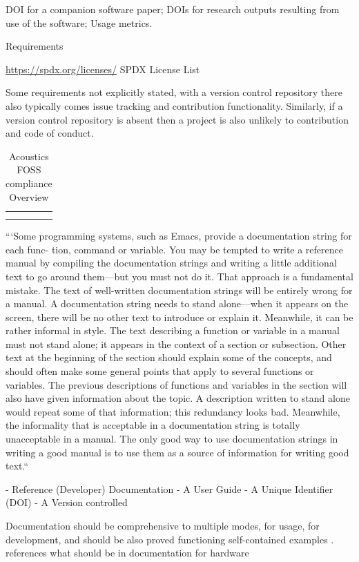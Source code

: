 DOI for a companion software paper;
DOIs for research outputs resulting from use of the software;
Usage metrics.

Requirements

\url{https://spdx.org/licenses/} SPDX License List

Some requirements not explicitly stated, with a version control repository there also typically comes issue tracking and contribution functionality. Similarly, if a version control repository is absent then a project is also unlikely to contribution and code of conduct.

\begin{table}[]
    \centering
    \begin{tabular}{c|c}
         &  \\
         & 
    \end{tabular}
    \caption{Acoustics FOSS compliance Overview}
    \label{tab:placeholder}
\end{table}


```Some programming systems, such as Emacs, provide a documentation string for each func- tion, command or variable. You may be tempted to write a reference manual by compiling the documentation strings and writing a little additional text to go around them—but you must not do it. That approach is a fundamental mistake. The text of well-written documentation strings will be entirely wrong for a manual.
A documentation string needs to stand alone—when it appears on the screen, there will be no other text to introduce or explain it. Meanwhile, it can be rather informal in style.
The text describing a function or variable in a manual must not stand alone; it appears in the context of a section or subsection. Other text at the beginning of the section should explain some of the concepts, and should often make some general points that apply to several functions or variables. The previous descriptions of functions and variables in the section will also have given information about the topic. A description written to stand alone would repeat some of that information; this redundancy looks bad. Meanwhile, the informality that is acceptable in a documentation string is totally unacceptable in a manual.
The only good way to use documentation strings in writing a good manual is to use them as a source of information for writing good text.``

- Reference (Developer) Documentation
- A User Guide
- A Unique Identifier (DOI)
- A Version controlled

Documentation should be comprehensive to multiple modes, for usage, for development, and should be also proved functioning self-contained examples \cite{aghajani_software_2020}.
references what should be in documentation for hardware \cite{oshwa_best_2013}


